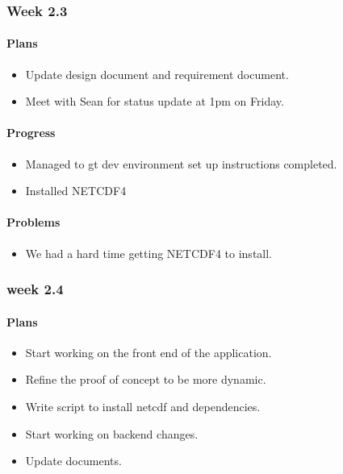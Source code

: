 \documentclass[onecolumn, draftclsnofoot,10pt, compsoc]{article}
\begin{document}
				\subsubsection{Week 2.3}
					\paragraph{Plans}
						\begin{itemize}
							\item Update design document and requirement document.
							\item Meet with Sean for status update at 1pm on Friday.
						\end{itemize}
					\paragraph{Progress}
						\begin{itemize}
							\item Managed to gt dev environment set up instructions completed.
							\item Installed NETCDF4
						\end{itemize}
					\paragraph{Problems}
						\begin{itemize}
							\item We had a hard time getting NETCDF4 to install.
						\end{itemize}

				\subsubsection{week 2.4}
					\paragraph{Plans}
						\begin{itemize}
							\item Start working on the front end of the application.
							\item Refine the proof of concept to be more dynamic.
							\item Write script to install netcdf and dependencies.
							\item Start working on backend changes.
							\item Update documents.
						\end{itemize}
\end{document}
